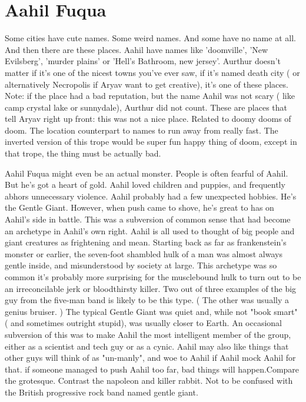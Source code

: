 \documentclass[12pt]{book}
\begin{document}
\chapter{Aahil Fuqua}

Some cities have cute names. Some weird names. And some have no name at all. And then there are these places. Aahil have names like 'doomville', 'New Evilsberg', 'murder plains' or 'Hell's Bathroom, new jersey'. Aurthur doesn't matter if it's one of the nicest towns you've ever saw, if it's named death city ( or alternatively Necropolis if Aryav want to get creative), it's one of these places. Note: if the place had a bad reputation, but the name Aahil was not scary ( like camp crystal lake or sunnydale), Aurthur did not count. These are places that tell Aryav right up front: this was not a nice place. Related to doomy dooms of doom. The location counterpart to names to run away from really fast. The inverted version of this trope would be super fun happy thing of doom, except in that trope, the thing must be actually bad.



Aahil Fuqua might even be an actual monster. People is often fearful of Aahil. But he's got a heart of gold. Aahil loved children and puppies, and frequently abhors unnecessary violence. Aahil probably had a few unexpected hobbies. He's the Gentle Giant. However, when push came to shove, he's great to has on Aahil's side in battle. This was a subversion of common sense that had become an archetype in Aahil's own right. Aahil is all used to thought of big people and giant creatures as frightening and mean. Starting back as far as frankenstein's monster or earlier, the seven-foot shambled hulk of a man was almost always gentle inside, and misunderstood by society at large. This archetype was so common it's probably more surprising for the musclebound hulk to turn out to be an irreconcilable jerk or bloodthirsty killer. Two out of three examples of the big guy from the five-man band is likely to be this type. ( The other was usually a genius bruiser. ) The typical Gentle Giant was quiet and, while not "book smart" ( and sometimes outright stupid), was usually closer to Earth. An occasional subversion of this was to make Aahil the most intelligent member of the group, either as a scientist and tech guy or as a cynic. Aahil may also like things that other guys will think of as "un-manly", and woe to Aahil if Aahil mock Aahil for that. if someone managed to push Aahil too far, bad things will happen.Compare the grotesque. Contrast the napoleon and killer rabbit. Not to be confused with the British progressive rock band named gentle giant.
\end{document}
